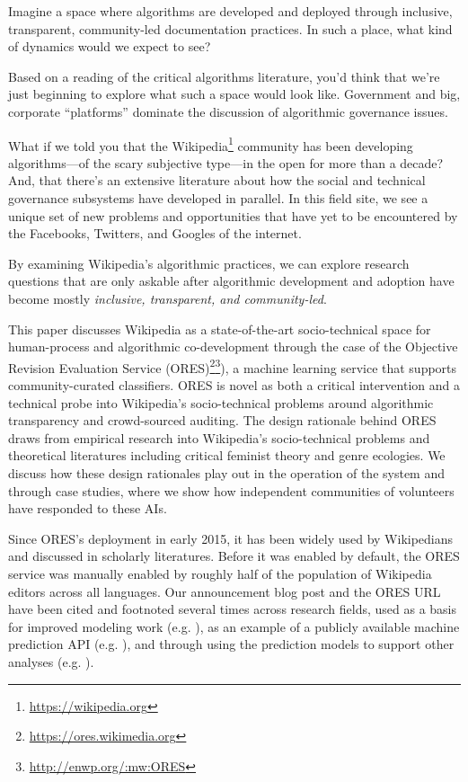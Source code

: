 
Imagine a space where algorithms are developed and deployed through inclusive, transparent, community-led documentation practices.  In such a place, what kind of dynamics would we expect to see?

Based on a reading of the critical algorithms literature, you'd think that we're just beginning to explore what such a space would look like.  Government and big, corporate ``platforms'' dominate the discussion of algorithmic governance issues\cite{crawford2016algorithm}\cite{diakopoulos2015algorithmic}\cite{gillespie2014relevance}\cite{tufekci2015algorithms}.

What if we told you that the Wikipedia\footnote{\url{https://wikipedia.org}} community has been developing algorithms---of the scary subjective type---in the open for more than a decade?  And, that there's an extensive literature about how the social and technical governance subsystems have developed in parallel.  In this field site, we see a unique set of new problems and opportunities that have yet to be encountered by the Facebooks, Twitters, and Googles of the internet.

By examining Wikipedia's algorithmic practices, we can explore research questions that are only askable after algorithmic development and adoption have become mostly \emph{inclusive, transparent, and community-led}.

This paper discusses Wikipedia as a state-of-the-art socio-technical space for human-process and algorithmic co-development through the case of the Objective Revision Evaluation Service (ORES)\footnote{\url{https://ores.wikimedia.org}}\footnote{\url{http://enwp.org/:mw:ORES}}), a machine learning service that supports community-curated classifiers.  ORES is novel as both a critical intervention and a technical probe\cite{hutchinson2003technology} into Wikipedia's socio-technical problems around algorithmic transparency and crowd-sourced auditing. The design rationale behind ORES draws from empirical research into Wikipedia's socio-technical problems and theoretical literatures including critical feminist theory and genre ecologies.  We discuss how these design rationales play out in the operation of the system and through case studies, where we show how independent communities of volunteers have responded to these AIs. 

Since ORES's deployment in early 2015, it has been widely used by Wikipedians and discussed in scholarly literatures.  Before it was enabled by default, the ORES service was manually enabled by roughly half of the population of Wikipedia editors across all languages.  Our announcement blog post\cite{halfaker2015artificial} and the ORES URL have been cited and footnoted several times across research fields, used as a basis for improved modeling work (e.g. \cite{dang2016quality}), as an example of a publicly available machine prediction API (e.g. \cite{lewoniewski2017relative}), and through using the prediction models to support other analyses (e.g. \cite{rezguia2017stigmergic}).

